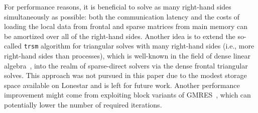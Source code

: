 
For performance reasons, it is beneficial to solve as many right-hand sides 
simultaneously as possible: both the communication latency and the costs of 
loading the local data from frontal and sparse matrices from main memory 
can be amortized over all of the right-hand sides. Another idea is to extend 
the so-called \verb!trsm! algorithm for triangular solves 
with many right-hand sides (i.e., more right-hand sides than processes), 
which is well-known in the field of dense linear 
algebra~\cite{Poulson-elemental}, into the realm of sparse-direct solvers via
the dense frontal triangular solves.
This approach was not pursued in this paper due to the modest storage space
available on Lonestar and is left for future work.
Another performance improvement might come from exploiting block variants of 
GMRES~\cite{Simoncini-block-gmres}, which can potentially lower the number of 
required iterations. 

